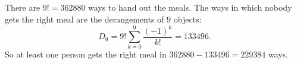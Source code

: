 There are $9!=362880$ ways to hand out the meals. The ways in which nobody gets the right meal are the derangements of $9$ objects:
\[D_9=9!\sum_{k=0}^{9}\dfrac{(-1)^k}{k!}=133496.\]
So at least one person gets the right meal in $362880-133496=\boxed{229384}$ ways.
